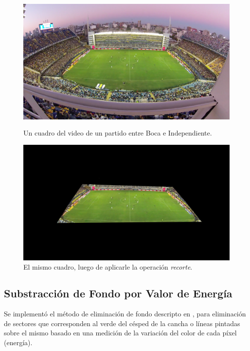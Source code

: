 \begin{figure}[H]
  \centering
    \begin{minipage}[t]{.45\textwidth}
      \includegraphics[width=\linewidth]{./images/Crop_Antes.png}
      \caption{Un cuadro del video de un partido entre Boca e Independiente.
      \label{fig:crop-antes}}
    \end{minipage}
    \begin{minipage}[t]{.45\textwidth}
      \centering
      \includegraphics[width=\linewidth]{./images/Crop_Despues.png}
      \caption{El mismo cuadro, luego de aplicarle la operación \textit{recorte}.
      \label{fig:crop-despues}}
    \end{minipage}
\end{figure}

\subsection{Substracción de Fondo por Valor de Energía}

Se implementó el método de eliminación de fondo descripto en
\cite{papers-tanos}, para eliminación de sectores que corresponden al
verde del césped de la cancha o líneas pintadas sobre el mismo basado en una
medición de la variación del color de cada píxel (energía).

